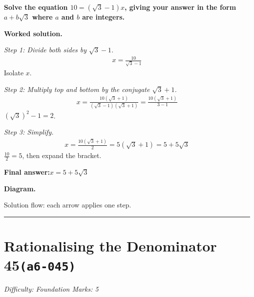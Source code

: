 \documentclass[11pt]{article}
\newcommand{\question}[1]{\par\medskip\noindent\textbf{#1}\par}
\begin{document}
\question{Solve the equation \( 10 = (\sqrt{3} - 1)x \), giving your answer in the form \( a + b\sqrt{3} \) where \( a \) and \( b \) are integers.}

\textbf{Worked solution.}

\textit{Step 1: Divide both sides by \( \sqrt{3} - 1 \).}
\[\begin{gathered}
x = \frac{10}{\sqrt{3} - 1}
\end{gathered}\]
Isolate \( x \).

\textit{Step 2: Multiply top and bottom by the conjugate \( \sqrt{3} + 1 \).}
\[\begin{gathered}
x = \frac{10(\sqrt{3} + 1)}{(\sqrt{3} - 1)(\sqrt{3} + 1)} = \frac{10(\sqrt{3} + 1)}{3 - 1}
\end{gathered}\]
\( (\sqrt{3})^2 - 1 = 2 \).

\textit{Step 3: Simplify.}
\[\begin{gathered}
x = \frac{10(\sqrt{3} + 1)}{2} = 5(\sqrt{3} + 1) = 5 + 5\sqrt{3}
\end{gathered}\]
\( \frac{10}{2} = 5 \), then expand the bracket.

\begin{answerbox}
\textbf{Final answer:}\quad \(\displaystyle x = 5 + 5\sqrt{3}\)
\end{answerbox}
\textbf{Diagram.}

\begin{center}
\end{center}
\small Solution flow: each arrow applies one step.\normalsize

\medskip\hrule

\section*{Rationalising the Denominator 45\quad\small\texttt{(a6-045)}}
\textit{Difficulty: Foundation \quad\textbar\quad Marks: 5}
\end{document}
